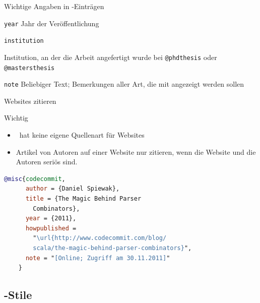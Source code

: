\begin{Frame}{Wichtige Angaben in \BibTeX-Einträgen}
  \begin{Block}{\lstinline-year-}
    Jahr der Veröffentlichung
  \end{Block}

  \begin{Block}{\lstinline-institution-}
    \raggedright
    Institution, an der die Arbeit angefertigt wurde
    bei \lstinline-@phdthesis- oder \lstinline-@mastersthesis-
  \end{Block}

  \begin{Block}{\lstinline-note-}
    Beliebiger Text; Bemerkungen aller Art,
    die mit angezeigt werden sollen
  \end{Block}
\end{Frame}

\begin{Frame}[fragile]{Websites zitieren}
  \begin{alertblock}{Wichtig}
    \begin{itemize}
      \item \BibTeX\ hat \alert{keine eigene Quellenart} für Websites
      \item \alert{Artikel von Autoren} auf einer Website nur zitieren,
        wenn die Website und die \alert{Autoren seriös} sind.
    \end{itemize}
  \end{alertblock}

  \xxx

  \begin{lstlisting}[language=BibTeX,gobble=4,moretexcs={url}]
    @misc{codecommit,
      author = {Daniel Spiewak},
      title = {The Magic Behind Parser
        Combinators},
      year = {2011},
      howpublished =
        "\url{http://www.codecommit.com/blog/
        scala/the-magic-behind-parser-combinators}",
      note = "[Online; Zugriff am 30.11.2011]"
    }
  \end{lstlisting}
\end{Frame}

\subsection{\BibTeX-Stile}

